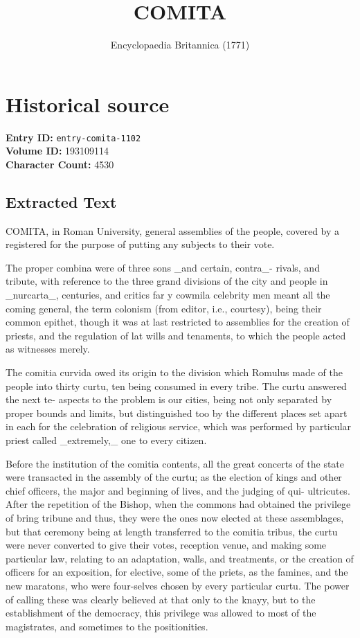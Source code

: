 \documentclass{article}
\title{COMITA}
\date{Encyclopaedia Britannica (1771)}
\begin{document}
\maketitle

\section*{Historical source}
\textbf{Entry ID:} \texttt{entry-comita-1102} \\
\textbf{Volume ID:} 193109114 \\
\textbf{Character Count:} 4530

\subsection*{Extracted Text}
COMITA, in Roman University, general assemblies of the people, covered by a registered for the purpose of putting any subjects to their vote.

The proper combina were of three sons \_and certain, contra\_- rivals, and tribute, with reference to the three grand divisions of the city and people in \_nurcarta\_, centuries, and critics far y cowmila celebrity men meant all the coming general, the term colonism (from editor, i.e., courtesy), being their common epithet, though it was at last restricted to assemblies for the creation of priests, and the regulation of lat wills and tenaments, to which the people acted as witnesses merely.

The comitia curvida owed its origin to the division which Romulus made of the people into thirty curtu, ten being consumed in every tribe. The curtu answered the next te- aspects to the problem is our cities, being not only separated by proper bounds and limits, but distinguished too by the different places set apart in each for the celebration of religious service, which was performed by particular priest called \_extremely,\_ one to every citizen.

Before the institution of the comitia contents, all the great concerts of the state were transacted in the assembly of the curtu; as the election of kings and other chief officers, the major and beginning of lives, and the judging of qui- ultricutes. After the repetition of the Bishop, when the commons had obtained the privilege of bring tribune and thus, they were the ones now elected at these assemblages, but that ceremony being at length transferred to the comitia tribus, the curtu were never converted to give their votes, reception venue, and making some particular law, relating to an adaptation, walls, and treatments, or the creation of officers for an exposition, for elective, some of the priets, as the famines, and the new maratons, who were four-selves chosen by every particular curtu. The power of calling these was clearly believed at that only to the knayy, but to the establishment of the democracy, this privilege was allowed to most of the magistrates, and sometimes to the positionities.
\end{document}
